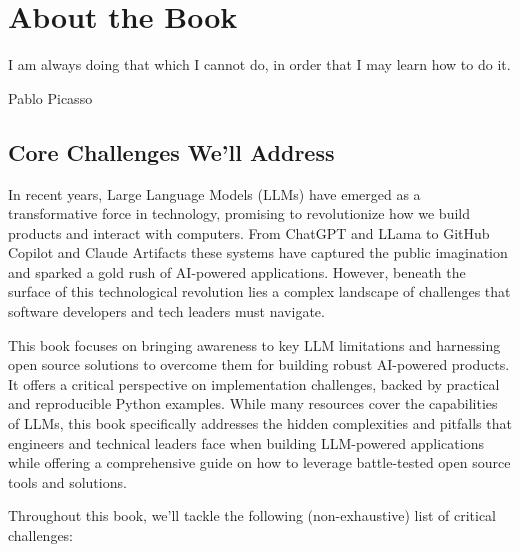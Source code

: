 \setchapterpreamble[u]{\margintoc}

\chapter*{About the Book}
\label{chapter:intro}

\epigraph{I am always doing that which I cannot do, in order that I may learn how to do it.}{Pablo Picasso}

\section{Core Challenges We'll Address}

In recent years, Large Language Models (LLMs) have emerged as a transformative force in technology, promising to revolutionize how we build products and interact with computers. From ChatGPT and LLama to GitHub Copilot and Claude Artifacts these systems have captured the public imagination and sparked a gold rush of AI-powered applications. However, beneath the surface of this technological revolution lies a complex landscape of challenges that software developers and tech leaders must navigate. 

This book focuses on bringing awareness to key LLM limitations and harnessing open source solutions to overcome them for building robust AI-powered products. It offers a critical perspective on implementation challenges, backed by practical and reproducible Python examples. While many resources cover the capabilities of LLMs, this book specifically addresses the hidden complexities and pitfalls that engineers and technical leaders face when building LLM-powered applications while offering a comprehensive guide on how to leverage battle-tested open source tools and solutions.

Throughout this book, we'll tackle the following (non-exhaustive) list of critical challenges:


